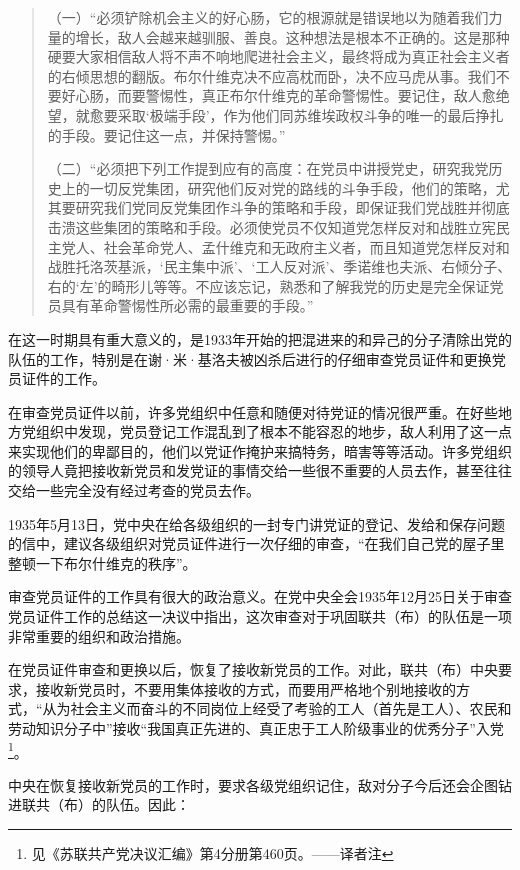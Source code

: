 \begin{quotation}
（一）“必须铲除机会主义的好心肠，它的根源就是错误地以为随着我们力量的增长，敌人会越来越驯服、善良。这种想法是根本不正确的。这是那种硬要大家相信敌人将不声不响地爬进社会主义，最终将成为真正社会主义者的右倾思想的翻版。布尔什维克决不应高枕而卧，决不应马虎从事。我们不要好心肠，而要警惕性，真正布尔什维克的革命警惕性。要记住，敌人愈绝望，就愈要采取‘极端手段’，作为他们同苏维埃政权斗争的唯一的最后挣扎的手段。要记住这一点，并保持警惕。”

（二）“必须把下列工作提到应有的高度：在党员中讲授党史，研究我党历史上的一切反党集团，研究他们反对党的路线的斗争手段，他们的策略，尤其要研究我们党同反党集团作斗争的策略和手段，即保证我们党战胜并彻底击溃这些集团的策略和手段。必须使党员不仅知道党怎样反对和战胜立宪民主党人、社会革命党人、孟什维克和无政府主义者，而且知道党怎样反对和战胜托洛茨基派，‘民主集中派’、‘工人反对派’、季诺维也夫派、右倾分子、右的‘左’的畸形儿等等。不应该忘记，熟悉和了解我党的历史是完全保证党员具有革命警惕性所必需的最重要的手段。”
\end{quotation}

在这一时期具有重大意义的，是1933年开始的把混进来的和异己的分子清除出党的队伍的工作，特别是在谢·米·基洛夫被凶杀后进行的仔细审查党员证件和更换党员证件的工作。

在审查党员证件以前，许多党组织中任意和随便对待党证的情况很严重。在好些地方党组织中发现，党员登记工作混乱到了根本不能容忍的地步，敌人利用了这一点来实现他们的卑鄙目的，他们以党证作掩护来搞特务，暗害等等活动。许多党组织的领导人竟把接收新党员和发党证的事情交给一些很不重要的人员去作，甚至往往交给一些完全没有经过考查的党员去作。

1935年5月13日，党中央在给各级组织的一封专门讲党证的登记、发给和保存问题的信中，建议各级组织对党员证件进行一次仔细的审查，“在我们自己党的屋子里整顿一下布尔什维克的秩序”。

审查党员证件的工作具有很大的政治意义。在党中央全会1935年12月25日关于审查党员证件工作的总结这一决议中指出，这次审查对于巩固联共（布）的队伍是一项非常重要的组织和政治措施。

在党员证件审查和更换以后，恢复了接收新党员的工作。对此，联共（布）中央要求，接收新党员时，不要用集体接收的方式，而要用严格地个别地接收的方式，“从为社会主义而奋斗的不同岗位上经受了考验的工人（首先是工人）、农民和劳动知识分子中”接收“我国真正先进的、真正忠于工人阶级事业的优秀分子”入党\footnote{见《苏联共产党决议汇编》第4分册第460页。——译者注}。

中央在恢复接收新党员的工作时，要求各级党组织记住，敌对分子今后还会企图钻进联共（布）的队伍。因此：

